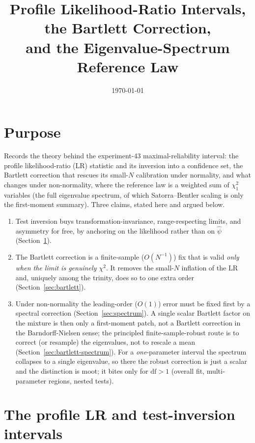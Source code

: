 \documentclass[11pt]{article}
\title{Profile Likelihood-Ratio Intervals, the Bartlett Correction,\\
and the Eigenvalue-Spectrum Reference Law}
\author{}
\date{\today}
\theoremstyle{plain}
\theoremstyle{remark}
\begin{document}
\maketitle

\section*{Purpose}

Records the theory behind the experiment-43 maximal-reliability interval: the
profile likelihood-ratio (LR) statistic and its inversion into a confidence set,
the Bartlett correction that rescues its small-$N$ calibration under normality,
and what changes under non-normality, where the reference law is a weighted sum
of $\chi^2_1$ variables (the full eigenvalue spectrum, of which Satorra--Bentler
scaling is only the first-moment summary). Three claims, stated here and argued
below.

\begin{enumerate}
\item Test inversion buys transformation-invariance, range-respecting limits,
and asymmetry for free, by anchoring on the likelihood rather than on
$\hat\psi$ (Section~\ref{sec:profile}).
\item The Bartlett correction is a finite-sample ($O(N^{-1})$) fix that is valid
\emph{only when the limit is genuinely $\chi^2$}. It removes the small-$N$
inflation of the LR and, uniquely among the trinity, does so to one extra order
(Section~\ref{sec:bartlett}).
\item Under non-normality the leading-order ($O(1)$) error must be fixed first by
a spectral correction (Section~\ref{sec:spectrum}). A single scalar Bartlett
factor on the mixture is then only a first-moment patch, not a Bartlett
correction in the Barndorff-Nielsen sense; the principled finite-sample-robust
route is to correct (or resample) the eigenvalues, not to rescale a mean
(Section~\ref{sec:bartlett-spectrum}). For a \emph{one}-parameter interval the
spectrum collapses to a single eigenvalue, so there the robust correction is just
a scalar and the distinction is moot; it bites only for $\mathrm{df}>1$ (overall
fit, multi-parameter regions, nested tests).
\end{enumerate}

\section{The profile LR and test-inversion intervals}
\label{sec:profile}
\end{document}
